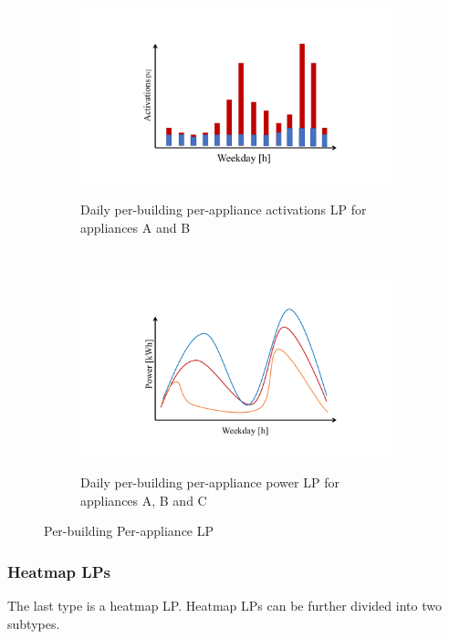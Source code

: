 \begin{figure}[H]
	\begin{subfigure}{.5\textwidth}
		\caption{Daily per-building per-appliance activations LP for appliances A and B}
		\includegraphics[width=1.2\textwidth]{Figures/profile_sketches/slide8.pdf}
		\label{fig:daily_act_m_profile}
	\end{subfigure}%
	~ 
	\begin{subfigure}{.5\textwidth}
		\caption{Daily per-building per-appliance power LP for appliances A, B and C}
		\includegraphics[width=1.2\textwidth]{Figures/profile_sketches/slide2.pdf}
		\label{fig:daily_power_m_profile}
	\end{subfigure}%
	\label{fig:daily_m_profile}
	\caption{Per-building Per-appliance LP}
\end{figure}

\subsubsection{Heatmap LPs}

The last type is a heatmap LP. 
Heatmap LPs can be further divided into two subtypes.

